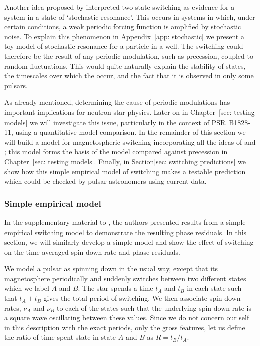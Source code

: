 Another idea proposed by \citet{Cordes2013} interpreted two state
switching as evidence for a system in a state of `stochastic resonance'.  This
occurs in systems in which, under certain conditions, a weak periodic forcing
function is amplified by stochastic noise. To explain this phenomenon in
Appendix~\ref{app: stochastic} we present a toy model of stochastic resonance
for a particle in a well. The switching could therefore be the result of any
periodic modulation, such as precession, coupled to random fluctuations. This
would quite naturally explain the stability of states, the timescales over
which the occur, and the fact that it is observed in only some pulsars.

As already mentioned, determining the cause of periodic modulations has
important implications for neutron star physics. Later on in Chapter~\ref{sec:
testing models} we will investigate this issue, particularly in the context of
PSR~B1828-11, using a quantitative model comparison. In the remainder of this
section we will build a model for magnetospheric switching incorporating all
the ideas of \citet{Lyne2010} and \citet{Perera2014}; this model forms the basis
of the model compared against precession in Chapter~\ref{sec: testing models}.
Finally, in Section\ref{sec: switching predictions} we show how this simple
empirical model of switching makes a testable prediction which could be
checked by pulsar astronomers using current data.

\subsubsection{Simple empirical model}

In the supplementary material to \citet{Lyne2010}, the authors presented
results from a simple empirical switching model to demonstrate the resulting
phase residuals. In this section, we will similarly develop a simple model and
show the effect of switching on the time-averaged spin-down rate and phase
residuals.

We model a pulsar as spinning down in the usual way, except that its
magnetosphere periodically and suddenly switches between two different states which
we label $A$ and $B$. The star spends a time $t_A$ and $t_B$ in each state such
that $t_A+t_B$ gives the total period of switching. We then associate spin-down
rates, $\dot{\nu}_{A}$ and $\dot{\nu}_{B}$ to each of the states such that the
underlying spin-down rate is a square wave oscillating between these values.
Since we do not concern our self in this description with the exact periods,
only the gross features, let us define the ratio of time spent state in state
$A$ and $B$ as $R = t_{B}/t_{A}$.

